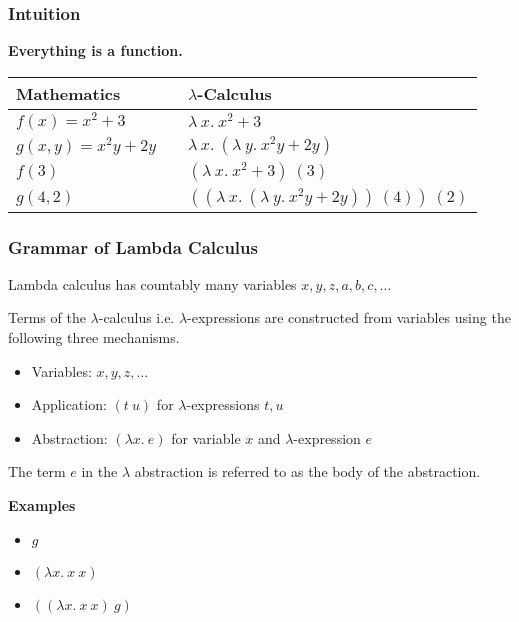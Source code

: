 \documentclass{beamer}
\begin{document}
\begin{frame}
	\frametitle{Intuition}

	\bf{Everything is a function.}


	\begin{center}
		\begin{tabular}{l c l}
			Mathematics & \hspace{1cm} & $\lambda$-Calculus \\
			\hline
			$f(x) = x^{2} + 3$ & & $\lambda \ x. \ x^{2} + 3$ \\
			$g(x,y) = x^{2}y + 2y$ & & $\lambda \ x. \ (\lambda \ y. \ x^{2}y + 2y)$\\
			$f(3)$ & & $(\lambda \ x. \ x^{2} + 3) \ (3)$ \\
			$g(4,2)$ & & $((\lambda \ x. \ (\lambda \ y. \ x^{2}y + 2y)) \ (4)) \ (2)$
		\end{tabular}
	\end{center}

	\vspace{4cm}

\end{frame}

\begin{frame}
	\frametitle{Grammar of Lambda Calculus}


	Lambda calculus has countably many variables $x,y,z,a,b,c,\dots$

	Terms of the $\lambda$-calculus i.e. $\lambda$-expressions are constructed from variables using the following three mechanisms.

	\begin{itemize}
		\item[] Variables: $x,y,z, \dots$
		\item[] Application: $(t \ u)$ for $\lambda$-expressions $t,u$
		\item[] Abstraction: $(\lambda x. \ e)$ for variable $x$ and $\lambda$-expression $e$
	\end{itemize}

	The term $e$ in the $\lambda$ abstraction is referred to as the body of the abstraction. 

	{\bf Examples}
	
	\begin{itemize}
		\item[] $g$
		
		\item[] $(\lambda x. \ x \ x)$

		\item[] $((\lambda x. \ x \ x) \ g)$
	\end{itemize}

\end{frame}
\end{document}
